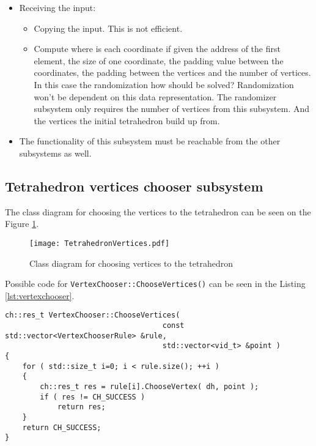 \begin{itemize}
	\item	Receiving the input:
		\begin{itemize}
			\item	Copying the input. This is not efficient.
			\item	Compute where is each coordinate if given the address of the
						first element, the size of one coordinate, the padding
						value between the coordinates, the padding between
						the vertices and the number of vertices.
						In this case the randomization how should be solved?
						Randomization won't be dependent on this data
						representation. The randomizer subsystem only requires
						the number of vertices from this subsystem. And the
						vertices the initial tetrahedron build up from.
		\end{itemize}
	\item	The functionality of this subsystem must be reachable from the other
		subsystems as well.
\end{itemize}



\subsection{Tetrahedron vertices chooser subsystem}

The class diagram for choosing the vertices to the tetrahedron can be seen on
the Figure \ref{fig:tetrahedronvertices}.

\begin{figure}[h]
	\centering
	\texttt{[image: TetrahedronVertices.pdf]}
	\caption{Class diagram for choosing vertices to the tetrahedron}
	\label{fig:tetrahedronvertices}
\end{figure}


Possible code for \texttt{VertexChooser::ChooseVertices()}  can be seen in
the Listing \ref{lst:vertexchooser}.

\begin{lstlisting}[caption={Possible code for the
							\texttt{VertexChooser::ChooseVertices()} function},
					label={lst:vertexchooser}]
ch::res_t VertexChooser::ChooseVertices(
									const std::vector<VertexChooserRule> &rule,
									std::vector<vid_t> &point )
{
	for ( std::size_t i=0; i < rule.size(); ++i )
	{
		ch::res_t res = rule[i].ChooseVertex( dh, point );
		if ( res != CH_SUCCESS )
			return res;
	}
	return CH_SUCCESS;
}
\end{lstlisting}


